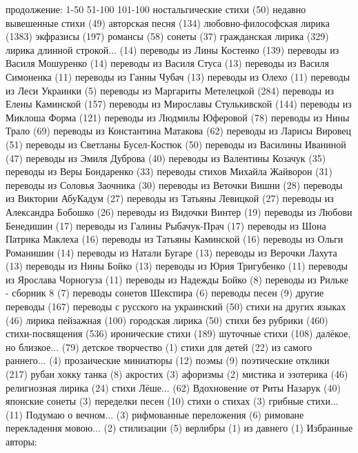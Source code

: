 продолжение: 1-50  51-100  101-100 
ностальгические стихи (50)
недавно вывешенные стихи (49)
авторская песня (134)
любовно-философская лирика (1383)
экфразисы (197)
романсы (58)
сонеты (37)
гражданская лирика (329)
лирика длинной строкой... (14)
переводы из Лины Костенко (139)
переводы из Василя Мошуренко (14)
переводы из Василя Стуса (13)
переводы из Василя Симоненка (11)
переводы из Ганны Чубач (13)
переводы из Олехо (11)
переводы из Леси Украинки (5)
переводы из Маргариты Метелецкой (284)
переводы из Елены Каминской (157)
переводы из Мирославы Стулькивской (144)
переводы из Миклоша Форма (121)
переводы из Людмилы Юферовой (78)
переводы из Нины Трало (69)
переводы из Константина Матакова (62)
переводы из Ларисы Вировец (51)
переводы из Светланы Бусел-Костюк (50)
переводы из Василины Иваниной (47)
переводы из Эмиля Дуброва (40)
переводы из Валентины Козачук (35)
переводы из Веры Бондаренко (33)
переводы стихов Михайла Жайворон (31)
переводы из Соловья Заочника (30)
переводы из Веточки Вишни (28)
переводы из Виктории АбуКадум (27)
переводы из Татьяны Левицкой (27)
переводы из Александра Бобошко (26)
переводы из Видочки Винтер (19)
переводы из Любови Бенедишин (17)
переводы из Галины Рыбачук-Прач (17)
переводы из Шона Патрика Маклеха (16)
переводы из Татьяны Каминской (16)
переводы из Ольги Романишин (14)
переводы из Натали Бугаре (13)
переводы из Верочки Лахута (13)
переводы из Нины Бойко (13)
переводы из Юрия Тригубенко (11)
переводы из Ярослава Чорногуза (11)
переводы из Надежды Бойко (8)
переводы из Рильке - сборник 8 (7)
переводы сонетов Шекспира (6)
переводы песен (9)
другие переводы (167)
переводы с русского на украинский (50)
стихи на других языках (46)
лирика пейзажная (100)
городская лирика (50)
стихи без рубрики (460)
стихи-посвящения (536)
иронические стихи (189)
шуточные стихи (108)
далёкое, но близкое... (79)
детское творчество (1)
стихи для детей (22)
из самого раннего... (4)
прозаические миниатюры (12)
поэмы (9)
поэтические отклики (217)
рубаи хокку танка (8)
акростих (3)
афоризмы (2)
мистика и эзотерика (46)
религиозная лирика (24)
стихи Лёше... (62)
Вдохновение от Риты Назарук (40)
японские сонеты (3)
переделки песен (10)
стихи о стихах (3)
грибные стихи... (11)
Подумаю о вечном... (3)
рифмованные переложения (6)
римоване перекладення мовою... (2)
стилизации (5)
верлибры (1)
из давнего (1)
Избранные авторы:
